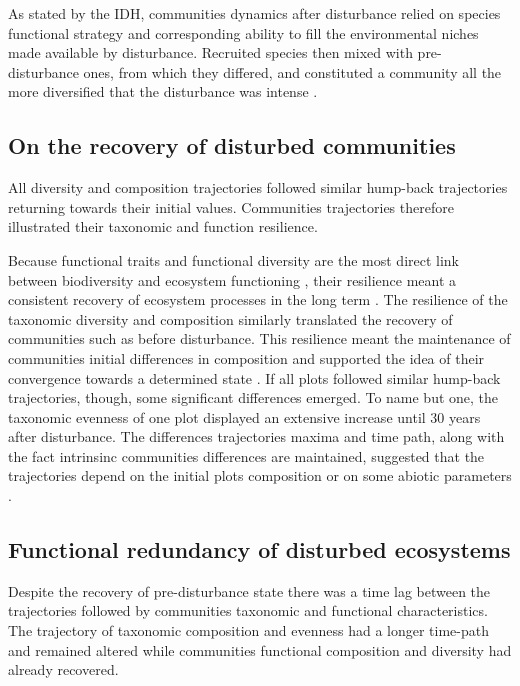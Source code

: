 \documentclass[fleqn,10pt]{ArtEcoFoG} %
\theoremstyle{definition}
\theoremstyle{definition}
\theoremstyle{definition}
\theoremstyle{remark}
\begin{document}
As stated by the IDH, communities dynamics after disturbance relied on
species functional strategy and corresponding ability to fill the
environmental niches made available by disturbance. Recruited species
then mixed with pre-disturbance ones, from which they differed, and
constituted a community all the more diversified that the disturbance
was intense \citep{Molino2001}.

\subsection{On the recovery of disturbed
communities}\label{on-the-recovery-of-disturbed-communities}

All diversity and composition trajectories followed similar hump-back
trajectories returning towards their initial values. Communities
trajectories therefore illustrated their taxonomic and function
resilience.

Because functional traits and functional diversity are the most direct
link between biodiversity and ecosystem functioning \citep{Diaz2005},
their resilience meant a consistent recovery of ecosystem processes in
the long term \citep{Guariguata2001}. The resilience of the taxonomic
diversity and composition similarly translated the recovery of
communities such as before disturbance. This resilience meant the
maintenance of communities initial differences in composition and
supported the idea of their convergence towards a determined state
\citep{Hubbell1999, Molino2001, Baraloto2012a}. If all plots followed
similar hump-back trajectories, though, some significant differences
emerged. To name but one, the taxonomic evenness of one plot displayed
an extensive increase until 30 years after disturbance. The differences
trajectories maxima and time path, along with the fact intrinsinc
communities differences are maintained, suggested that the trajectories
depend on the initial plots composition or on some abiotic parameters
\citep{Anderson2007}.

\subsection{Functional redundancy of disturbed
ecosystems}\label{functional-redundancy-of-disturbed-ecosystems}

Despite the recovery of pre-disturbance state there was a time lag
between the trajectories followed by communities taxonomic and
functional characteristics. The trajectory of taxonomic composition and
evenness had a longer time-path and remained altered while communities
functional composition and diversity had already recovered.
\end{document}
